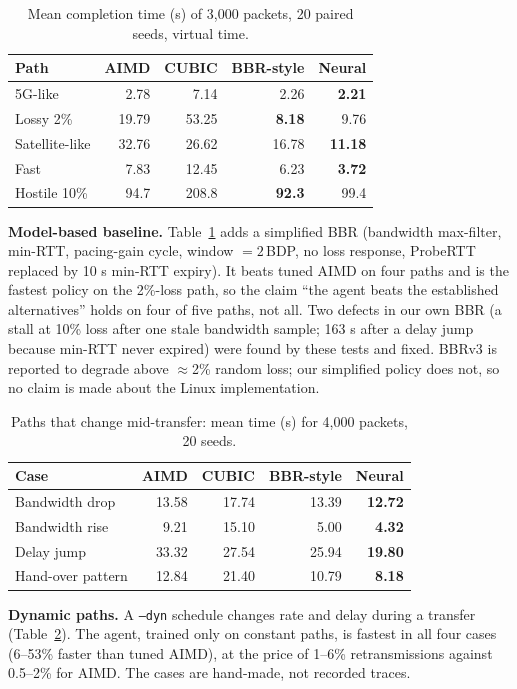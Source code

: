 \documentclass[10pt,twocolumn]{article}
\begin{document}
\begin{table}[t]\centering\small
\caption{Mean completion time (s) of 3,000 packets, 20 paired seeds, virtual time.}\label{t:bbr}
\begin{tabular}{@{}lrrrr@{}}\toprule
Path & AIMD & CUBIC & BBR-style & Neural\\\midrule
5G-like & 2.78 & 7.14 & 2.26 & \textbf{2.21}\\
Lossy 2\% & 19.79 & 53.25 & \textbf{8.18} & 9.76\\
Satellite-like & 32.76 & 26.62 & 16.78 & \textbf{11.18}\\
Fast & 7.83 & 12.45 & 6.23 & \textbf{3.72}\\
Hostile 10\% & 94.7 & 208.8 & \textbf{92.3} & 99.4\\\bottomrule
\end{tabular}\end{table}

\textbf{Model-based baseline.} Table~\ref{t:bbr} adds a simplified BBR (bandwidth max-filter, min-RTT, pacing-gain cycle, window $=2\,$BDP, no loss response, ProbeRTT replaced by 10 s min-RTT expiry). It beats tuned AIMD on four paths and is the fastest policy on the 2\%-loss path, so the claim ``the agent beats the established alternatives'' holds on four of five paths, not all. Two defects in our own BBR (a stall at 10\% loss after one stale bandwidth sample; 163 s after a delay jump because min-RTT never expired) were found by these tests and fixed. BBRv3 is reported to degrade above $\approx$2\% random loss; our simplified policy does not, so no claim is made about the Linux implementation.

\begin{table}[t]\centering\small
\caption{Paths that change mid-transfer: mean time (s) for 4,000 packets, 20 seeds.}\label{t:dyn}
\begin{tabular}{@{}lrrrr@{}}\toprule
Case & AIMD & CUBIC & BBR-style & Neural\\\midrule
Bandwidth drop & 13.58 & 17.74 & 13.39 & \textbf{12.72}\\
Bandwidth rise & 9.21 & 15.10 & 5.00 & \textbf{4.32}\\
Delay jump & 33.32 & 27.54 & 25.94 & \textbf{19.80}\\
Hand-over pattern & 12.84 & 21.40 & 10.79 & \textbf{8.18}\\\bottomrule
\end{tabular}\end{table}

\textbf{Dynamic paths.} A \texttt{--dyn} schedule changes rate and delay during a transfer (Table~\ref{t:dyn}). The agent, trained only on constant paths, is fastest in all four cases (6--53\% faster than tuned AIMD), at the price of 1--6\% retransmissions against 0.5--2\% for AIMD. The cases are hand-made, not recorded traces.
\end{document}
